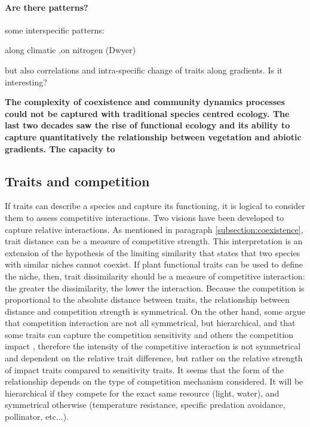

\paragraph{Are there patterns?}

some interspecific patterns:

along climatic \parencite{niinemets_global-scale_2001, wright_worldwide_2004}
,on nitrogen (Dwyer)

but also correlations and intra-specific
change of traits along gradients. Is it interesting?



\textbf{The complexity of coexistence and community dynamics processes could not be captured with traditional species centred ecology. The last two decades saw the rise of functional ecology and its ability to capture quantitatively the relationship between vegetation and abiotic gradients. The capacity to }

\subsection{Traits and competition}

If traits can describe a species and capture its functioning, it is logical to consider them to assess competitive interactions. Two visions have been developed to capture relative interactions. As mentioned in paragraph \ref{subsection:coexistence}, trait distance can be a measure of competitive strength. This interpretation is an extension of the hypothesis of the limiting similarity that states that two species with similar niches cannot coexist. If plant functional traits can be used to define the niche, then, trait dissimilarity should be a measure of competitive interaction: the greater the dissimilarity, the lower the interaction. Because the competition is proportional to the absolute distance between traits, the relationship between distance and competition strength is symmetrical. On the other hand, some argue that competition interaction are not all symmetrical, but hierarchical, and that some traits can capture the competition sensitivity and others the competition impact \parencite{kunstler_plant_2016}, therefore the intensity of the competitive interaction is not symmetrical and dependent on the relative trait difference, but rather on the relative strength of impact traits compared to sensitivity traits. It seems that the form of the relationship depends on the type of competition mechanism considered. It will be hierarchical if they compete for the exact same resource (light, water), and symmetrical otherwise (temperature resistance, specific predation avoidance, pollinator, etc...).

